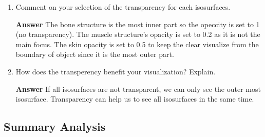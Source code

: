 \documentclass[11pt]{article}
\begin{document}
\begin{enumerate}[label=\arabic*.]

\item Comment on your selection of the transparency for each isosurfaces.

\noindent\textbf{Answer} The bone structure is the most inner part so the opeccity is set to 1 (no transparency). The muscle structure's opacity is set to 0.2 as it is not the main focus. The skin opacity is set to 0.5 to keep the clear visualize from the boundary of object since it is the most outer part.

\item How does the transperency benefit your visualization? Explain.

\noindent\textbf{Answer} If all isosurfaces are not transparent, we can only see the outer most isosurface. Transparency can help us to see all isosurfaces in the same time.

\end{enumerate}

\subsection*{Summary Analysis}
\end{document}
